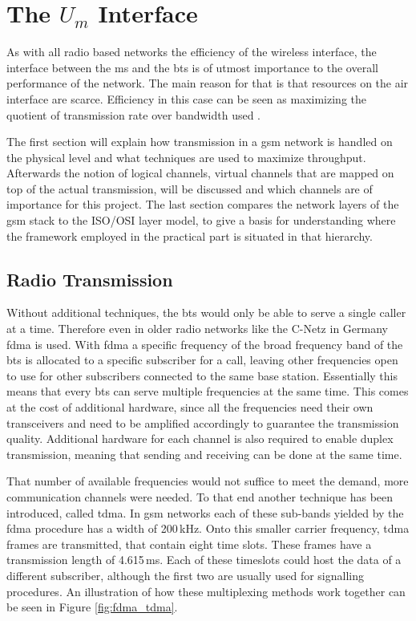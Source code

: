 \section{The $U_m$ Interface}
\label{sec:Um}
As with all radio based networks the efficiency of the wireless interface, the interface between the \gls{ms} and the \gls{bts} is of utmost importance to the overall performance of the network.
The main reason for that is that resources on the air interface are scarce.
Efficiency in this case can be seen as maximizing the quotient of transmission rate over bandwidth used \cite{protocols1999}.

The first section will explain how transmission in a \gls{gsm} network is handled on the physical level and what techniques are used to maximize throughput.
Afterwards the notion of logical channels, virtual channels that are mapped on top of the actual transmission, will be discussed and which channels are of importance for this project.
The last section compares the network layers of the \gls{gsm} stack to the ISO/OSI layer model, to give a basis for understanding where the framework employed in the practical part is situated in that hierarchy.

\subsection{Radio Transmission}
\label{sec:radio}
Without additional techniques, the \gls{bts} would only be able to serve a single caller at a time. 
Therefore even in older radio networks like the C-Netz in Germany \gls{fdma} is used.
With \gls{fdma} a specific frequency of the broad frequency band of the \gls{bts} is allocated to a specific subscriber for a call, leaving other frequencies open to use for other subscribers connected to the same base station.
Essentially this means that every \gls{bts} can serve multiple frequencies at the same time.
This comes at the cost of additional hardware, since all the frequencies need their own transceivers and need to be amplified accordingly to guarantee the transmission quality.
Additional hardware for each channel is also required to enable duplex transmission, meaning that sending and receiving can be done at the same time.

That number of available frequencies would not suffice to meet the demand, more communication channels were needed.
To that end another technique has been introduced, called \gls{tdma}.
In \gls{gsm} networks each of these sub-bands yielded by the \gls{fdma} procedure has a width of 200\,kHz.
Onto this smaller carrier frequency, \gls{tdma} frames are transmitted, that contain eight time slots.
These frames have a transmission length of 4.615\,ms.
Each of these timeslots could host the data of a different subscriber, although the first two are usually used for signalling procedures.
An illustration of how these multiplexing methods work together can be seen in Figure \ref{fig:fdma_tdma}.

